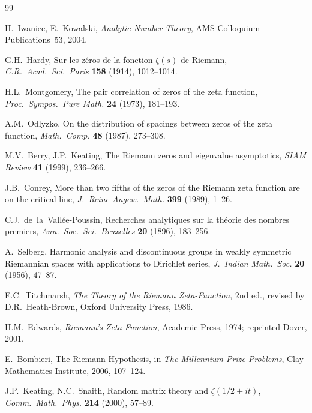 \documentclass[11pt]{article}
\theoremstyle{remark}
\begin{document}
\begin{thebibliography}{99}

  H.~Iwaniec, E.~Kowalski,
  \textit{Analytic Number Theory},
  AMS Colloquium Publications~53, 2004.

  G.H.~Hardy,
  Sur les z\'eros de la fonction $\zeta(s)$ de Riemann,
  \textit{C.R.\ Acad.\ Sci.\ Paris} \textbf{158} (1914), 1012--1014.

  H.L.~Montgomery,
  The pair correlation of zeros of the zeta function,
  \textit{Proc.\ Sympos.\ Pure Math.} \textbf{24} (1973), 181--193.

  A.M.~Odlyzko,
  On the distribution of spacings between zeros of the zeta function,
  \textit{Math.\ Comp.} \textbf{48} (1987), 273--308.

  M.V.~Berry, J.P.~Keating,
  The Riemann zeros and eigenvalue asymptotics,
  \textit{SIAM Review} \textbf{41} (1999), 236--266.

  J.B.~Conrey,
  More than two fifths of the zeros of the Riemann zeta function are on the
  critical line,
  \textit{J.\ Reine Angew.\ Math.} \textbf{399} (1989), 1--26.

  C.J.~de~la~Vall\'ee-Poussin,
  Recherches analytiques sur la th\'eorie des nombres premiers,
  \textit{Ann.\ Soc.\ Sci.\ Bruxelles} \textbf{20} (1896), 183--256.

  A.~Selberg,
  Harmonic analysis and discontinuous groups in weakly symmetric Riemannian
  spaces with applications to Dirichlet series,
  \textit{J.\ Indian Math.\ Soc.} \textbf{20} (1956), 47--87.

  E.C.~Titchmarsh,
  \textit{The Theory of the Riemann Zeta-Function},
  2nd ed., revised by D.R.~Heath-Brown, Oxford University Press, 1986.

  H.M.~Edwards,
  \textit{Riemann's Zeta Function},
  Academic Press, 1974; reprinted Dover, 2001.

  E.~Bombieri,
  The Riemann Hypothesis,
  in \textit{The Millennium Prize Problems}, Clay Mathematics Institute, 2006,
  107--124.

  J.P.~Keating, N.C.~Snaith,
  Random matrix theory and $\zeta(1/2+it)$,
  \textit{Comm.\ Math.\ Phys.} \textbf{214} (2000), 57--89.


\end{thebibliography}
\end{document}
